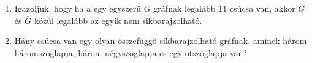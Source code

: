 \documentclass[a4paper, 12pt]{article}
\begin{document}
\begin{enumerate}
\begin{figure}[!ht]
\begin{subfigure}{0.25\textwidth}
                    \caption{PZH - 2011}
                \end{subfigure}
                \begin{subfigure}{0.2\textwidth}
                    \centering					
                    
                    \caption{ZH - 2012}
                \end{subfigure}
            \end{figure}
            \item Igazoljuk, hogy ha a egy egyszerű $G$ gráfnak legalább $11$ csúcsa van, akkor $G$ és $\bar{G}$ közül legalább az egyik nem síkbarajzolható.
            \item Hány csúcsa van egy olyan összefüggő síkbarajzolható gráfnak, aminek három háromszöglapja, három négyszöglapja és egy ötszöglapja van?
        \end{enumerate}
    
    
\end{document}
